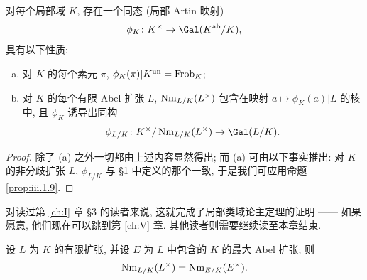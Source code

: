 \begin{theorem}\label{thm:iii.3.4}
对每个局部域 $K$, 存在一个同态 (局部 Artin 映射)
\[
 \phi_K\colon K^\times\to\Gal(K^{\mathrm{ab}}/K),
\]
具有以下性质:
\begin{enumerate}[(a)]
\item 对 $K$ 的每个素元 $\pi$, $\phi_K(\pi)|K^{\mathrm{un}}=\operatorname{Frob}_K$;
\item 对 $K$ 的每个有限 Abel 扩张 $L$, $\operatorname{Nm}_{L/K}(L^\times)$ 包含在映射 $a\mapsto\phi_K(a)|L$ 的核中, 且 $\phi_K$ 诱导出同构
\[
 \phi_{L/K}\colon K^\times/\Nm_{L/K}(L^\times)\to\Gal(L/K).
\]
\end{enumerate}
\end{theorem}

\begin{proof}
除了 (a) 之外一切都由上述内容显然得出; 而 (a) 可由以下事实推出: 对 $K$ 的非分歧扩张 $L$, $\phi_{L/K}$ 与 \S 1 中定义的那个一致, 于是我们可应用命题\ref{prop:iii.1.9}.
\end{proof}

对读过第 \ref{ch:I} 章 \S 3 的读者来说, 这就完成了局部类域论主定理的证明 —— 如果愿意, 他们现在可以跳到第 \ref{ch:V} 章. 其他读者则需要继续读至本章结束.

\begin{theorem}[范限制定理]\label{thm:iii.3.5}
设 $L$ 为 $K$ 的有限扩张, 并设 $E$ 为 $L$ 中包含的 $K$ 的最大 Abel 扩张; 则
\[
 \operatorname{Nm}_{L/K}(L^\times)=\operatorname{Nm}_{E/K}(E^\times).
\]
\end{theorem}

